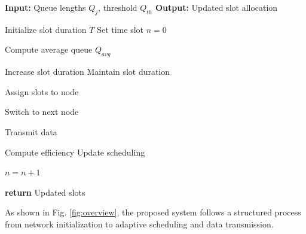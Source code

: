 \documentclass[a4paper,fleqn]{cas-dc}
\numberwithin{equation}{section}
\begin{document}
\begin{algorithm}
\caption{Phase 6: Adaptive Slot Allocation / Re scheduling}
\begin{algorithmic}

\STATE \textbf{Input:} Queue lengths $Q_j$, threshold $Q_{th}$
\STATE \textbf{Output:} Updated slot allocation

\STATE Initialize slot duration $T$
\STATE Set time slot $n = 0$


    \STATE Compute average queue $Q_{avg}$

        \STATE Increase slot duration
    \ELSE
        \STATE Maintain slot duration
    \ENDIF

        \STATE Assign slots to node
        
            \STATE Switch to next node
        \ENDIF
        
            \STATE Transmit data
        \ENDIF
    \ENDFOR

    \STATE Compute efficiency
    \STATE Update scheduling

    \STATE $n = n + 1$

\ENDWHILE

\STATE \textbf{return} Updated slots

\end{algorithmic}
\end{algorithm}
As shown in Fig. \ref{fig:overview}, the proposed system follows a structured process from network initialization to adaptive scheduling and data transmission.
\end{document}
